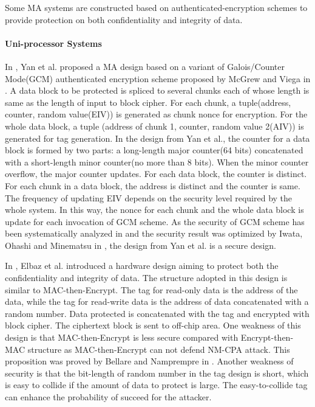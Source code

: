 \documentclass{article}
\begin{document}
Some MA systems are constructed based on authenticated-encryption schemes to
provide protection on both confidentiality and integrity of data. 
\paragraph{Uni-processor Systems}
In \cite{yan-MA}, Yan et al. proposed a MA design based on a variant of Galois/Counter Mode(GCM) authenticated encryption scheme proposed by McGrew and Viega in \cite{gcm}. A data block to be protected is spliced to several chunks each of whose length is same as the length of input to block cipher. For each chunk, a tuple(address, counter, random value(EIV)) is generated as chunk nonce for encryption. For the whole data block, a tuple (address of chunk 1, counter, random value 2(AIV)) is generated for tag generation. 
In the design from Yan et al., the counter for a data block is formed by two parts: a long-length major counter(64 bits) concatenated with a short-length minor counter(no more than 8 bits). When the minor counter overflow, the major counter updates. For each data block, the counter is distinct. For each chunk in a data block, the address is distinct and the counter is same. The frequency of updating EIV depends on the security level required by the whole system.  In this way, the nonce for each chunk and the whole data block is update for each invocation of GCM scheme. As the security of GCM scheme has been systematically analyzed in \cite{gcm} and the security result was optimized by Iwata, Ohashi and Minematsu in \cite{breaking}, the design from Yan et al. is a secure design.


In \cite{pc-ice}, Elbaz et al. introduced a hardware design aiming to protect both the confidentiality and integrity of data. The structure adopted in this design is similar to MAC-then-Encrypt. The tag for read-only data is the address of the data, while the tag for read-write data is the address of data concatenated with a random number. Data protected is concatenated with the tag and encrypted with block cipher. The ciphertext block is sent to off-chip area.
One weakness of this design is that MAC-then-Encrypt is less secure compared with Encrypt-then-MAC structure as MAC-then-Encrypt can not defend NM-CPA attack. This proposition was proved by Bellare and Namprempre in \cite{ae-notion}.
Another weakness of security is that the bit-length of random number in the tag design is short, which is easy to collide if the amount of data to protect is large. The easy-to-collide tag can enhance the probability of succeed for the attacker.
\end{document}
